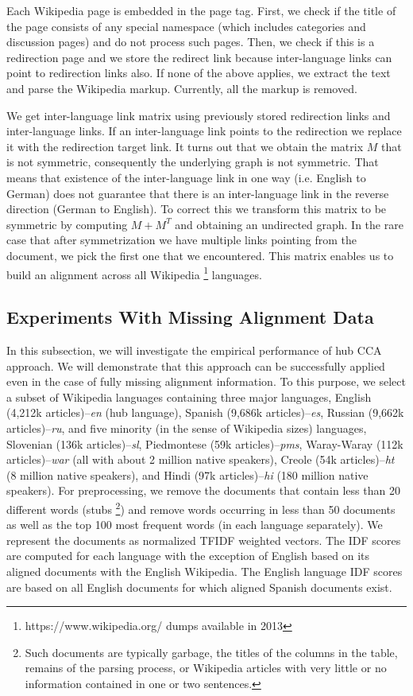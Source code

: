 \documentclass[twoside,11pt]{article}
\begin{document}
Each Wikipedia page is embedded in the page tag. First, we check if the title of the page consists of any special namespace (which includes categories and discussion pages) and do not process such pages. Then, we check if this is a redirection page and we store the redirect link because inter-language links can point to redirection links also. If none of the above applies, we extract the text and parse the Wikipedia markup. Currently, all the markup is removed.

We get inter-language link matrix using previously stored redirection links and inter-language links. If an inter-language link points to the redirection we replace it with the redirection target link. It turns out that we obtain the matrix $M$ that is not symmetric, consequently the underlying graph is not symmetric. That means that existence of the inter-language link in one way (i.e. English to German) does not guarantee that there is an inter-language link in the reverse direction (German to English). To correct this we transform this matrix to be symmetric by computing $M+M^T$ and obtaining an undirected graph. In the rare case that after symmetrization we have multiple links pointing from the document, we pick the first one that we encountered. This matrix enables us to build an alignment across all Wikipedia \footnote{https://www.wikipedia.org/ dumps available in 2013} languages.

\subsection{Experiments With Missing Alignment Data}\label{experiments:hubcca}

 In this subsection, we will investigate the empirical performance of hub CCA approach. We will demonstrate that this approach can be successfully applied even in the case of fully missing alignment information.
 To this purpose, we select a subset of Wikipedia languages containing three major languages, English (4,212k articles)--\emph{en} (hub language), Spanish (9,686k articles)--\emph{es}, Russian (9,662k articles)--\emph{ru}, and five minority (in the sense of Wikipedia sizes) languages, Slovenian (136k articles)--\emph{sl}, Piedmontese (59k articles)--\emph{pms}, Waray-Waray (112k articles)--\emph{war} (all with about 2 million native speakers), Creole (54k articles)--\emph{ht} (8 million native speakers), and Hindi (97k articles)--\emph{hi} (180 million native speakers). For preprocessing, we remove the documents that contain less than 20 different words (stubs \footnote{Such documents are typically garbage, the titles of the columns in the table, remains of the parsing process, or Wikipedia articles with very little or no information contained in one or two sentences.}) and remove words occurring in less than 50 documents as well as the top 100 most frequent words (in each language separately). We represent the documents as normalized TFIDF\cite{Salton88term-weightingapproaches} weighted vectors. The IDF scores are computed for each language with the exception of English based on its aligned documents with the English Wikipedia. The English language IDF scores are based on all English documents for which aligned Spanish documents exist.
\end{document}
